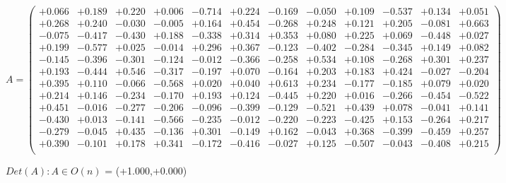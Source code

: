 \documentclass[9pt]{article}
\theoremstyle{plain}
\theoremstyle{definition}
\theoremstyle{remark}
\numberwithin{equation}{section}
\begin{document}
$A = \left(
\begin{array}{
cccccccccccc}
+0.066 & +0.189 & +0.220 & +0.006 & -0.714 & +0.224 & -0.169 & -0.050 & +0.109 & -0.537 & +0.134 & +0.051 \\
+0.268 & +0.240 & -0.030 & -0.005 & +0.164 & +0.454 & -0.268 & +0.248 & +0.121 & +0.205 & -0.081 & +0.663 \\
-0.075 & -0.417 & -0.430 & +0.188 & -0.338 & +0.314 & +0.353 & +0.080 & +0.225 & +0.069 & -0.448 & +0.027 \\
+0.199 & -0.577 & +0.025 & -0.014 & +0.296 & +0.367 & -0.123 & -0.402 & -0.284 & -0.345 & +0.149 & +0.082 \\
-0.145 & -0.396 & -0.301 & -0.124 & -0.012 & -0.366 & -0.258 & +0.534 & +0.108 & -0.268 & +0.301 & +0.237 \\
+0.193 & -0.444 & +0.546 & -0.317 & -0.197 & +0.070 & -0.164 & +0.203 & +0.183 & +0.424 & -0.027 & -0.204 \\
+0.395 & +0.110 & -0.066 & -0.568 & +0.020 & +0.040 & +0.613 & +0.234 & -0.177 & -0.185 & +0.079 & +0.020 \\
+0.214 & +0.146 & -0.234 & -0.170 & +0.193 & +0.124 & -0.445 & +0.220 & +0.016 & -0.266 & -0.454 & -0.522 \\
+0.451 & -0.016 & -0.277 & -0.206 & -0.096 & -0.399 & -0.129 & -0.521 & +0.439 & +0.078 & -0.041 & +0.141 \\
-0.430 & +0.013 & -0.141 & -0.566 & -0.235 & -0.012 & -0.220 & -0.223 & -0.425 & +0.153 & -0.264 & +0.217 \\
-0.279 & -0.045 & +0.435 & -0.136 & +0.301 & -0.149 & +0.162 & -0.043 & +0.368 & -0.399 & -0.459 & +0.257 \\
+0.390 & -0.101 & +0.178 & +0.341 & -0.172 & -0.416 & -0.027 & +0.125 & -0.507 & -0.043 & -0.408 & +0.215 \\
\end{array}
\right)$ \newline 

$Det(A) :   A \in O(n)$ = (+1.000,+0.000)
\end{document}
